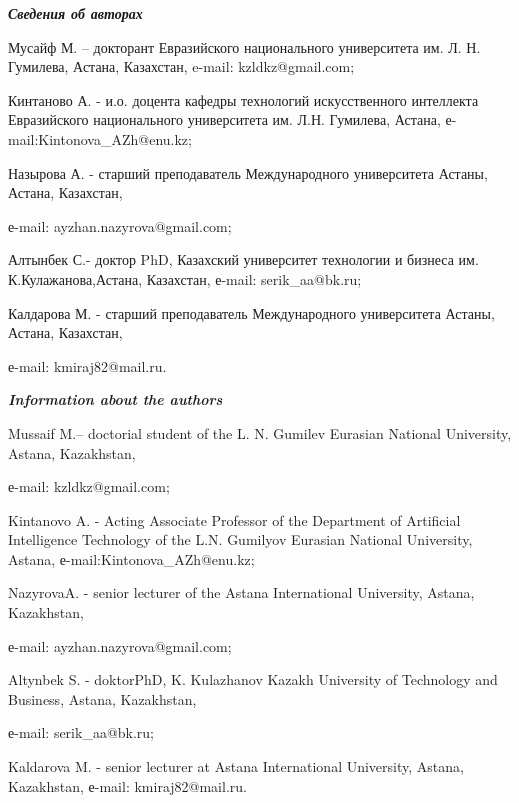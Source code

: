 \emph{{\bfseries Сведения об авторах}}

\begin{noparindent}
Мусайф М. -- докторант Евразийского национального университета им. Л. Н.
Гумилева, Астана, Казахстан, e-mail: kzldkz@gmail.com;

Кинтаново А. - и.о. доцента кафедры технологий искусственного интеллекта
Евразийского национального университета им. Л.Н. Гумилева, Астана,
е-mail:Kintonova\_AZh@enu.kz;

Назырова А. - старший преподаватель Международного университета Астаны,
Астана, Казахстан,

е-mail: ayzhan.nazyrova@gmail.com;

Алтынбек С.- доктор PhD, Казахский университет технологии и бизнеса им.
К.Кулажанова,Астана, Казахстан, е-mail: serik\_aa@bk.ru;

Калдарова М. - старший преподаватель Международного университета Астаны,
Астана, Казахстан,

е-mail: kmiraj82@mail.ru.
\end{noparindent}

\emph{{\bfseries Information about the authors}}

\begin{noparindent}
Mussaif M.-- doctorial student of the L. N. Gumilev Eurasian National
University, Astana, Kazakhstan,

е-mail: kzldkz@gmail.com;

Kintanovo A. - Acting Associate Professor of the Department of
Artificial Intelligence Technology of the L.N. Gumilyov Eurasian
National University, Astana, е-mail:Kintonova\_AZh@enu.kz;

NazyrovaA. - senior lecturer of the Astana International University,
Astana, Kazakhstan,

е-mail: ayzhan.nazyrova@gmail.com;

Altynbek S. - doktorPhD, K. Kulazhanov Kazakh University of Technology
and Business, Astana, Kazakhstan,

е-mail: serik\_aa@bk.ru;

Kaldarova M. - senior lecturer at Astana International University,
Astana, Kazakhstan, е-mail: kmiraj82@mail.ru.
\end{noparindent}
